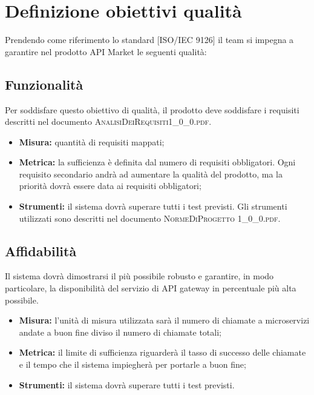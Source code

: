 \newpage
\section{Definizione obiettivi qualità}
	
	Prendendo come riferimento lo standard [ISO/IEC 9126] il team si impegna a
	garantire nel prodotto API Market le seguenti qualità:
	
	\subsection{Funzionalità}
		Per soddisfare questo obiettivo di qualità, il prodotto deve soddisfare i requisiti descritti nel documento \textsc{AnalisiDeiRequisiti1\_0\_0.pdf}.  
		
		\begin{itemize}
			\item \textbf{Misura: }quantità di requisiti mappati;
			\item \textbf{Metrica: }la sufficienza è definita dal numero di requisiti obbligatori. Ogni requisito secondario andrà ad aumentare la qualità del prodotto, ma la priorità dovrà essere data ai requisiti obbligatori;
			\item \textbf{Strumenti: }il sistema dovrà superare tutti i test previsti. Gli strumenti utilizzati sono descritti nel documento \textsc{NormeDiProgetto 1\_0\_0.pdf}.
			
		\end{itemize}
	
	\subsection{Affidabilità}
		Il sistema dovrà dimostrarsi il più possibile robusto e garantire, in modo particolare, la disponibilità del servizio di API gateway in percentuale più alta possibile. 
		
		\begin{itemize}
			\item \textbf{Misura: }l'unità di misura utilizzata sarà il numero di chiamate a microservizi andate a buon fine diviso il numero di chiamate totali;
			\item \textbf{Metrica: }il limite di sufficienza riguarderà il tasso di successo delle chiamate e il tempo che il sistema impiegherà per portarle a buon fine;
			\item \textbf{Strumenti: } il sistema dovrà superare tutti i test previsti.
			
		\end{itemize}
	
